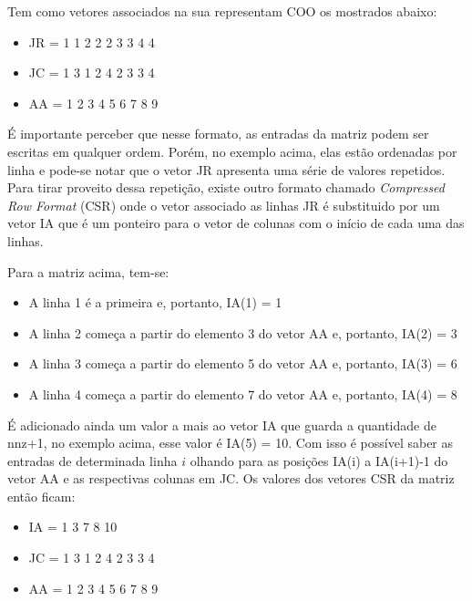 Tem como vetores associados na sua representam COO os mostrados abaixo:


\begin{center}
    \begin{itemize}
        \item  JR = 1 1 2 2 2 3 3 4 4
        \item  JC = 1 3 1 2 4 2 3 3 4
        \item  AA = 1 2 3 4 5 6 7 8 9
    \end{itemize}
\end{center}


É importante perceber que nesse formato, as entradas da matriz podem ser escritas em qualquer ordem. Porém, no exemplo acima, elas estão ordenadas por linha e pode-se notar que o vetor JR apresenta uma série de valores repetidos. Para tirar proveito dessa repetição, existe outro formato chamado \textit{Compressed Row Format} (CSR) onde o vetor associado as linhas JR é substituido por um vetor IA que é um ponteiro para o vetor de colunas com o início de cada uma das linhas.

Para a matriz acima, tem-se:

\begin{itemize}
    \item A linha 1 é a primeira e, portanto, IA(1) = 1
    \item A linha 2 começa a partir do elemento 3 do vetor AA e, portanto, IA(2) = 3
    \item A linha 3 começa a partir do elemento 5 do vetor AA e, portanto, IA(3) = 6
    \item A linha 4 começa a partir do elemento 7 do vetor AA e, portanto, IA(4) = 8
\end{itemize}

É adicionado ainda um valor a mais ao vetor IA que guarda a quantidade de nnz+1, no exemplo acima, esse valor é IA(5) = 10. Com isso é possível saber as entradas de determinada linha $i$ olhando para as posições IA(i) a IA(i+1)-1 do vetor AA e as respectivas colunas em JC. Os valores dos vetores CSR da matriz então ficam:

\begin{center}
    \begin{itemize}
        \item IA = 1 3 7 8 10
        \item JC = 1 3 1 2 4 2 3 3 4
        \item AA = 1 2 3 4 5 6 7 8 9
    \end{itemize}
\end{center}


